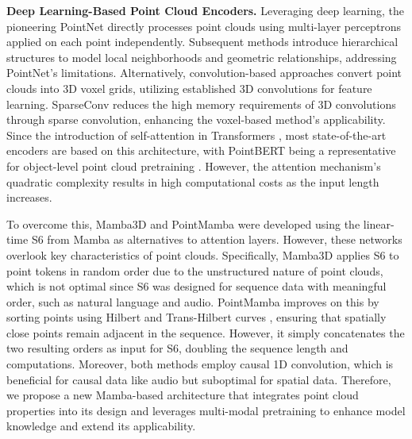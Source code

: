 \vspace{1mm} \noindent\textbf{Deep Learning-Based Point Cloud Encoders.}
Leveraging deep learning, the pioneering PointNet \cite{pointnet} directly processes point clouds using multi-layer perceptrons applied on each point independently. Subsequent methods \cite{pointnet++,pointnext,dgcnn} introduce hierarchical structures to model local neighborhoods and geometric relationships, addressing PointNet's limitations. Alternatively, convolution-based approaches \cite{voxnet,sparseconvnet} convert point clouds into 3D voxel grids, utilizing established 3D convolutions for feature learning. SparseConv \cite{sparseconvnet} reduces the high memory requirements of 3D convolutions through sparse convolution, enhancing the voxel-based method's applicability. Since the introduction of self-attention in Transformers \cite{transformer}, most state-of-the-art encoders \cite{pointbert,pointmae,point_trans_v2,point_trans_v3} are based on this architecture, with PointBERT \cite{pointbert} being a representative for object-level point cloud pretraining \cite{pointbert,openshape,ulip,ulip2,tamm}. However, the attention mechanism's quadratic complexity results in high computational costs as the input length increases.

To overcome this, Mamba3D \cite{mamba3d} and PointMamba \cite{pointmamba} were developed using the linear-time S6 from Mamba \cite{mamba} as alternatives to attention layers. However, these networks overlook key characteristics of point clouds. Specifically, Mamba3D \cite{mamba3d} applies S6 to point tokens in random order due to the unstructured nature of point clouds, which is not optimal since S6 was designed for sequence data with meaningful order, such as natural language and audio. PointMamba \cite{pointmamba} improves on this by sorting points using Hilbert and Trans-Hilbert curves \cite{hilbert_curve}, ensuring that spatially close points remain adjacent in the sequence. However, it simply concatenates the two resulting orders as input for S6, doubling the sequence length and computations. Moreover, both methods employ causal 1D convolution, which is beneficial for causal data like audio but suboptimal for spatial data.
Therefore, we propose a new Mamba-based architecture that integrates point cloud properties into its design and leverages multi-modal pretraining to enhance model knowledge and extend its applicability.